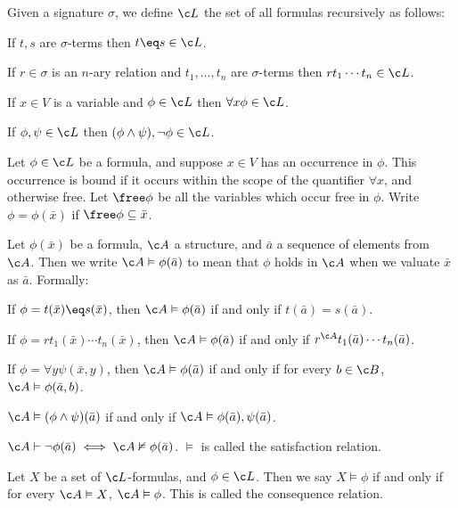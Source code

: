     Given a signature $\sigma$, we define $\c L$ the set of all formulas recursively as follows:
    \benum
        \item If $t,s$ are $\sigma$-terms then $t\eq s\in\c L$.
        \item If $r\in\sigma$ is an $n$-ary relation and $t_1,\dots,t_n$ are $\sigma$-terms then $rt_1\cdots t_n\in\c L$.
        \item If $x\in V$ is a variable and $\phi\in\c L$ then $\forall x\phi\in\c L$.
        \item If $\phi,\psi\in\c L$ then $(\phi\land\psi),\neg\phi\in\c L$.
    \eenum

\edefn

\bdefn

    Let $\phi\in\c L$ be a formula, and suppose $x\in V$ has an occurrence in $\phi$.
    This occurrence is {\emphcolor bound} if it occurs within the scope of the quantifier $\forall x$, and otherwise {\emphcolor free}.
    Let $\free\phi$ be all the variables which occur free in $\phi$.
    Write $\phi=\phi(\bar x)$ if $\free\phi\subseteq\bar x$.

\edefn

\bdefn

    Let $\phi(\bar x)$ be a formula, $\c A$ a structure, and $\bar a$ a sequence of elements from $\c A$.
    Then we write $\c A\vDash\phi(\bar a)$ to mean that $\phi$ holds in $\c A$ when we valuate $\bar x$ as $\bar a$.
    Formally:
    \benum
        \item If $\phi=t(\bar x)\eq s(\bar x)$, then $\c A\vDash\phi(\bar a)$ if and only if $t(\bar a)=s(\bar a)$.
        \item If $\phi=rt_1(\bar x)\cdots t_n(\bar x)$, then $\c A\vDash\phi(\bar a)$ if and only if $r^{\c A}t_1(\bar a)\cdots t_n(\bar a)$.
        \item If $\phi=\forall y\psi(\bar x,y)$, then $\c A\vDash\phi(\bar a)$ if and only if for every $b\in\c B$, $\c A\vDash\phi(\bar a,b)$.
        \item $\c A\vDash(\phi\land\psi)(\bar a)$ if and only if $\c A\vDash\phi(\bar a),\psi(\bar a)$.
        \item $\c A\vdash\neg\phi(\bar a)\iff\c A\nvDash\phi(\bar a)$.
    \eenum
    $\vDash$ is called the {\emphcolor satisfaction relation}.

\edefn

\bdefn

    Let $X$ be a set of $\c L$-formulas, and $\phi\in\c L$.
    Then we say $X\vDash\phi$ if and only if for every $\c A\vDash X$, $\c A\vDash\phi$.
    This is called the {\emphcolor consequence relation}.

